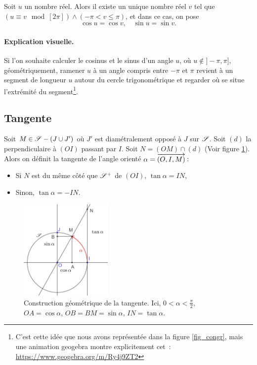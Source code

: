 		\begin{defi}
			Soit $u$ un nombre réel. Alors il existe un unique nombre réel $v$ tel que $(u\equiv v\mod[2\pi])\wedge(-\pi<v\le\pi)$, et dans ce cas, on pose
			\begin{equation}
				\cos u= \cos v,\quad \sin u=\sin v.
			\end{equation}
		\end{defi}

		\paragraph{Explication visuelle.} Si l'on souhaite calculer le cosinus et le sinus d'un angle $u$, où $u\notin]-\pi,\pi]$, géométriquement, ramener $u$ à un angle compris entre $-\pi$ et $\pi$ revient à  un segment de longueur $u$ autour du cercle trigonométrique et regarder où se situe l'extrémité du segment\footnote{C'est cette idée que nous avons représentée dans la figure \ref{fig_congr}, mais une animation geogebra montre explicitement cet \,: \url{https://www.geogebra.org/m/Ry4j9ZT2}}. 

	\subsection{Tangente}
		\begin{defi}
			Soit $M\in\S-(J\cup J')$ où $J'$ est diamétralement opposé à $J$ sur $\S$. Soit $(d)$ la perpendiculaire à $(OI)$ passant par $I$. Soit $N=(OM)\cap(d)$ (Voir figure \ref{fig_tangente}). Alors on définit la tangente de l'angle orienté $\alpha=\ovr{(O,I,M)}$\,:
			\begin{itemize}[label=\textbullet]
				\item Si $N$ est du même côté que $\S^+$ de $(OI)$, $\tan\alpha=IN$,
				\item Sinon, $\tan\alpha=-IN$.
			\end{itemize}
		\end{defi}

		\begin{figure}
			\includegraphics[width=0.4\textwidth]{image/fct_trigo/tangente.png}
			\caption{Construction géométrique de la tangente. Ici, $0<\alpha<\frac{\pi}{2}$, $OA=\cos\alpha$, $OB=BM=\sin\alpha$, $IN=\tan\alpha$.}
			\label{fig_tangente}
		\end{figure}

